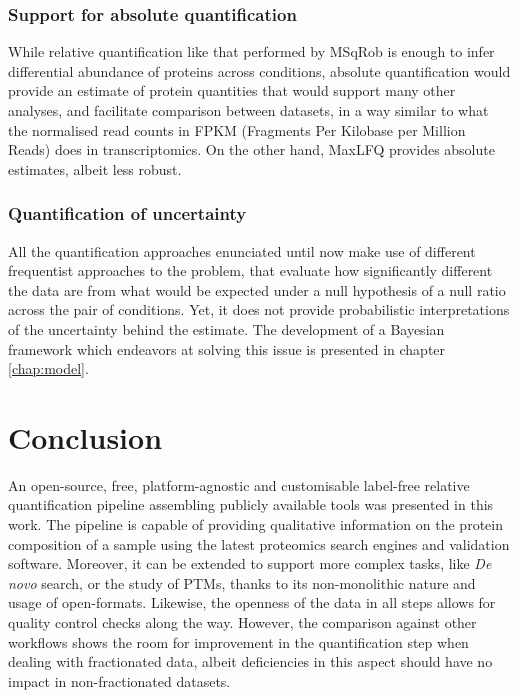 \documentclass[11pt, a4paper]{report}
\begin{document}
\subsubsection{Support for absolute quantification}

While relative quantification like that performed by MSqRob is enough to infer differential abundance of proteins across conditions, absolute quantification would provide an estimate of protein quantities that would support many other analyses, and facilitate comparison between datasets, in a way similar to what the normalised read counts in FPKM (Fragments Per Kilobase per Million Reads) does in transcriptomics. On the other hand, MaxLFQ provides absolute estimates, albeit less robust.

\subsubsection{Quantification of uncertainty}

All the quantification approaches enunciated until now make use of different frequentist approaches to the problem, that evaluate how significantly different the data are from what would be expected under a null hypothesis of a null ratio across the pair of conditions. Yet, it does not provide probabilistic interpretations of the uncertainty behind the estimate. The development of a Bayesian framework which endeavors at solving this issue is presented in chapter \ref{chap:model}.


\section{Conclusion}

An open-source, free, platform-agnostic and customisable label-free relative quantification pipeline assembling publicly available tools was presented in this work. The pipeline is capable of providing qualitative information on the protein composition of a sample using the latest proteomics search engines and validation software. Moreover, it can be extended to support more complex tasks, like \textit{De novo} search, or the study of \ac{PTM}s, thanks to its non-monolithic nature and usage of open-formats. Likewise, the openness of the data in all steps allows for quality control checks along the way. However, the comparison against other workflows shows the room for improvement in the quantification step when dealing with fractionated data, albeit deficiencies in this aspect should have no impact in non-fractionated datasets.
\end{document}
